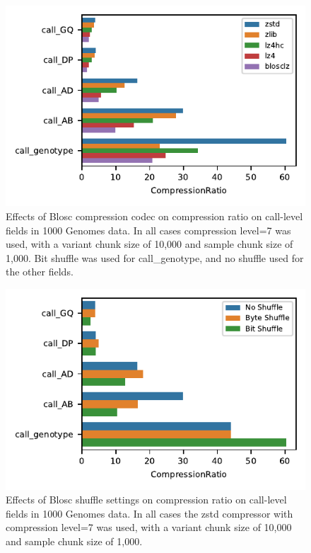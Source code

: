 \documentclass[a4paper,num-refs]{oup-contemporary}
\begin{document}
\begin{figure}[h]
\includegraphics{figures/compression-compressor}
\caption{Effects of Blosc compression codec on compression ratio on call-level
fields in 1000 Genomes data.
In all cases compression level=7 was used, with a variant
chunk size of 10,000 and sample chunk size of 1,000.
Bit shuffle was used for call\_genotype, and no shuffle used for the other fields.
\label{fig-compression-compressor}}
\end{figure}

\begin{figure}[h]
\includegraphics{figures/compression-shuffle}
\caption{Effects of Blosc shuffle settings on compression ratio on call-level
fields in 1000 Genomes data.
In all cases the zstd compressor with compression level=7 was used, with a variant
chunk size of 10,000 and sample chunk size of 1,000.
\label{fig-compression-shuffle}}
\end{figure}
\end{document}
